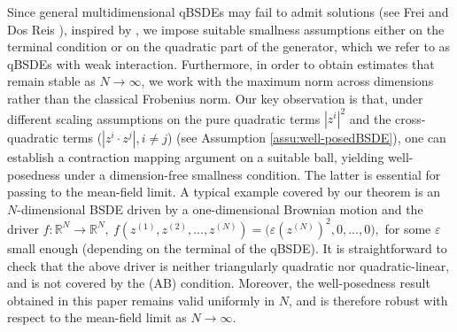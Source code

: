 \documentclass[10pt,a4paper]{article}
\newcommand{\vep}{{\varepsilon}}
\theoremstyle{plain}
\theoremstyle{definition}
\numberwithin{equation}{section}
\begin{document}
Since general multidimensional qBSDEs may fail to admit solutions (see Frei and Dos Reis \cite{FreiDosReis2011MFE}), inspired by \cite{Tev08}, we impose suitable smallness assumptions either on the terminal condition or on the quadratic part of the generator, which we refer to as qBSDEs with weak interaction. Furthermore, in order to obtain estimates that remain stable as \(N \to \infty\), we work with the maximum norm across dimensions rather than the classical Frobenius norm. Our key observation is that, under different scaling assumptions on the pure quadratic terms $|z^i|^2$ and the cross-quadratic terms ($|z^i \cdot z^j|, i \neq j$) (see Assumption \ref{assu:well-posedBSDE}), one can establish a contraction mapping argument on a suitable ball, yielding well-posedness under a dimension-free smallness condition. The latter is essential for passing to the mean-field limit. A typical example covered by our theorem is an $N$-dimensional BSDE driven by a one-dimensional Brownian motion and the driver
$
f:\mathbb{R}^N \to \mathbb{R}^N,
\ 
f(z^{(1)}, z^{(2)}, ..., z^{(N)})=\big(\vep (z^{(N)})^2,0, ..., 0\big),
$
for some $\vep$ small enough (depending on the terminal of the qBSDE). It is straightforward to check that the above driver is neither triangularly quadratic nor quadratic-linear, and is not covered by the (AB) condition. Moreover, the well-posedness result obtained in this paper remains valid uniformly in \(N\), and is therefore robust with respect to the mean-field limit as \(N\to\infty\).
\end{document}
